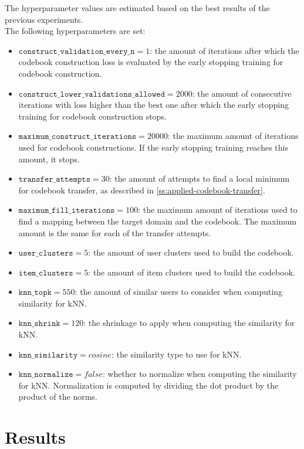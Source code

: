 The hyperparameter values are estimated based on the best results of the previous experiments.\\
The following hyperparameters are set:
\begin{itemize}
\item $\texttt{construct\_validation\_every\_n} = 1$: the amount of iterations after which the codebook construction loss is evaluated by the early stopping training for codebook construction.
\item $\texttt{construct\_lower\_validations\_allowed} = 2000$: the amount of consecutive iterations with loss higher than the best one after which the early stopping training for codebook construction stops.
\item $\texttt{maximum\_construct\_iterations} = 20000$: the maximum amount of iterations used for codebook constructions. If the early stopping training reaches this amount, it stops.
\item $\texttt{transfer\_attempts} = 30$: the amount of attempts to find a local minimum for codebook transfer, as described in \autoref{ss:applied-codebook-transfer}.
\item $\texttt{maximum\_fill\_iterations} = 100$: the maximum amount of iterations used to find a mapping between the target domain and the codebook. The maximum amount is the same for each of the transfer attempts.
\item $\texttt{user\_clusters} = 5$: the amount of user clusters used to build the codebook.
\item $\texttt{item\_clusters} = 5$: the amount of item clusters used to build the codebook.
\item $\texttt{knn\_topk} = 550$: the amount of similar users to consider when computing similarity for kNN.
\item $\texttt{knn\_shrink} = 120$: the shrinkage to apply when computing the similarity for kNN.
\item $\texttt{knn\_similarity} = cosine$: the similarity type to use for kNN.
\item $\texttt{knn\_normalize} = false$: whether to normalize when computing the similarity for kNN. Normalization is computed by dividing the dot product by the product of the norms.
\end{itemize}

\clearpage



\section{Results}

